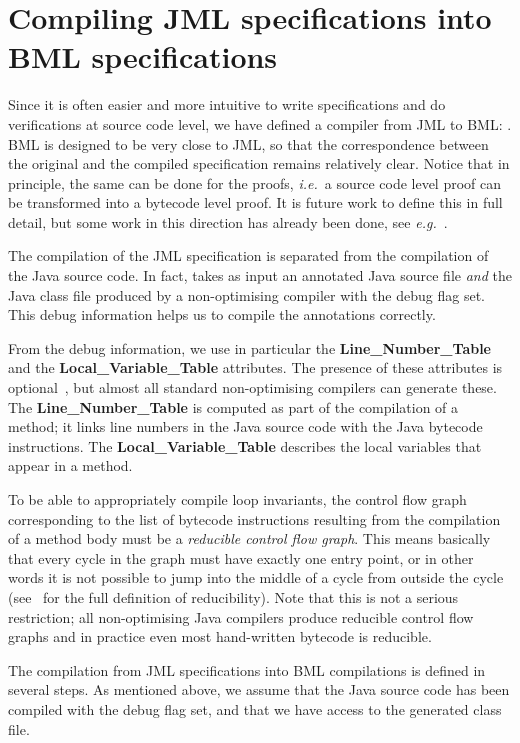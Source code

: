 \section{Compiling JML specifications into BML specifications}\label{SecJMLtoBML} 

Since it is often easier and more intuitive to write specifications
and do verifications at source code level, we have defined a compiler
from JML to BML:
\JMLtoBML. BML is designed to be very close to JML, so that the
correspondence between the original and the compiled specification
remains relatively clear. Notice that in principle, the same can be
done for the proofs,
\emph{i.e.}\ a source code level proof can be transformed into a
bytecode level proof. It is future work to define this in full detail,
but some work in this direction has already been done, see
\emph{e.g.}~\cite{BartheRS05}. 

The compilation of the JML specification is separated from the
compilation of the Java source code. In fact, \JMLtoBML takes as input
an annotated Java source file \emph{and} the Java class file produced
by a non-optimising compiler with the debug flag set. This debug
information helps us to compile the annotations correctly.

From the debug information, we use in particular the
\textbf{Line\_Number\_Table} and the \textbf{Local\_Variable\_Table}
attributes. The presence of these attributes is
optional~\cite{JVMspec}, but almost all standard non-optimising
compilers can generate these. The \textbf{Line\_Number\_Table} is
computed as part of the compilation of a method; it links line numbers
in the Java source code with the Java bytecode instructions.  The
\textbf{Local\_Variable\_Table} describes the local variables that
appear in a method.  

To be able to appropriately compile loop invariants, the control flow
graph corresponding to the list of bytecode instructions resulting
from the compilation of a method body must be a
\emph{reducible control flow graph}. This means basically that every 
cycle in the graph must have exactly one entry point, or in other words
 it is not possible to jump into the middle of a cycle from outside the cycle
(see~\cite{AhoSU86} for the full definition of reducibility). Note
that this is not a serious restriction; all non-optimising Java
compilers produce reducible control flow graphs and in practice even
most hand-written bytecode is reducible.

The compilation from JML specifications into BML compilations is
defined in several steps. As mentioned above, we assume that the Java
source code has been compiled with the debug flag set, and that we
have access to the generated class file.

